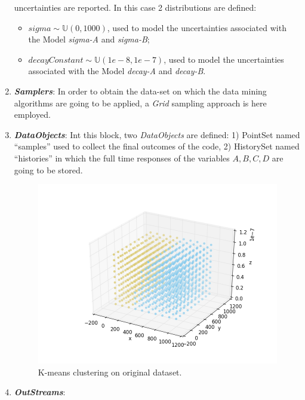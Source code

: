 \begin{enumerate}
  uncertainties are reported. In
  this case 2 distributions are defined:
  \begin{itemize}
    \item $sigma \sim \mathbb{U}(0,1000)$, used to model the uncertainties
    associated with  the Model \textit{sigma-A} and \textit{sigma-B};
    \item  $decayConstant \sim \mathbb{U}(1e-8,1e-7)$,  used to
    model the uncertainties
    associated with  the Model \textit{decay-A} and \textit{decay-B}.
  \end{itemize}
   \item \textbf{\textit{Samplers}}:
  In order to obtain the data-set on which the data mining algorithms are going to be applied, a \textit{Grid} sampling approach is here employed.
   \item \textbf{\textit{DataObjects}}:
  Int this block, two \textit{DataObjects} are defined:
  1) PointSet named ``samples'' used to collect the final outcomes of
  the code,
  2) HistorySet named ``histories'' in which the full time responses of the
  variables $A,B,C,D$ are going to be stored.
 \begin{figure}[h!]
  \centering
  \includegraphics[scale=0.7]{../../tests/framework/user_guide/DataMining/gold/dataMiningAnalysis/1-PlotLabels_dataMining.png}
  \caption{K-means clustering on original dataset.}
  \label{fig:KmeanOrigData}
 \end{figure}
   \item \textbf{\textit{OutStreams}}:

\end{enumerate}
